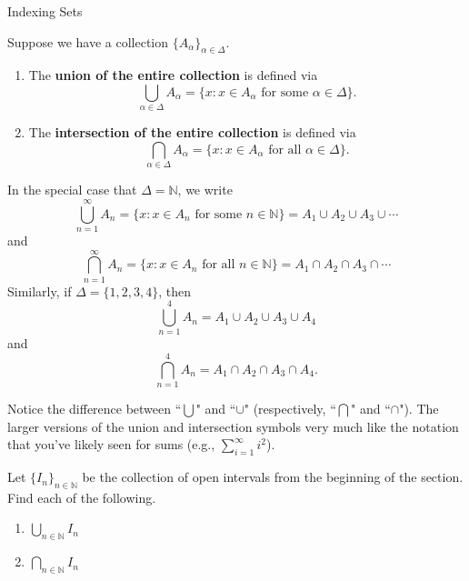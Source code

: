 \begin{section}{Indexing Sets}
\begin{example}
\begin{enumerate}
\end{enumerate}
\end{example}

\begin{definition}
Suppose we have a collection $\{A_{\alpha}\}_{\alpha\in\Delta}$.

\begin{enumerate}
\item The \textbf{union of the entire collection} is defined via
\[
\bigcup_{\alpha\in\Delta} A_{\alpha}=\{x:x\in A_{\alpha} \mbox{ for some }\alpha\in \Delta\}.
\]

\item The \textbf{intersection of the entire collection} is defined via
\[
\bigcap_{\alpha\in\Delta} A_{\alpha}=\{x:x\in A_{\alpha} \mbox{ for all }\alpha\in \Delta\}.
\]

\end{enumerate}
\end{definition}

\begin{example} 
In the special case that $\Delta=\mathbb{N}$, we write
\[
\bigcup_{n=1}^{\infty}A_n= \{ x : x \in A_n \mbox{ for some } n \in \mathbb{N}\}= A_1\cup A_2 \cup A_3 \cup \cdots
\] 
and
\[
\bigcap_{n=1}^{\infty}A_n= \{ x : x \in A_n \mbox{ for all } n \in \mathbb{N}\} = A_1\cap A_2 \cap A_3 \cap \cdots
\] 
Similarly, if $\Delta=\{1,2,3,4\}$, then
\[
\bigcup_{n=1}^{4}A_n= A_1\cup A_2 \cup A_3 \cup A_4
\] 
and
\[
\bigcap_{n=1}^{4}A_n= A_1\cap A_2 \cap A_3 \cap A_4.
\] 
\end{example}

\begin{remark}
Notice the difference between ``$\bigcup$" and ``$\cup$" (respectively, ``$\bigcap$" and ``$\cap$").  The larger versions of the union and intersection symbols very much like the notation that you've likely seen for sums (e.g., $\displaystyle \sum_{i=1}^\infty i^2$).
\end{remark}

\begin{exercise}
Let $\{I_n\}_{n\in\mathbb{N}}$ be the collection of open intervals from the beginning of the section.  Find each of the following.
\begin{enumerate}
\item $\displaystyle \bigcup_{n\in\mathbb{N}}I_n$
\item $\displaystyle \bigcap_{n\in\mathbb{N}}I_n$
\end{enumerate}
\end{exercise}


\end{section}
